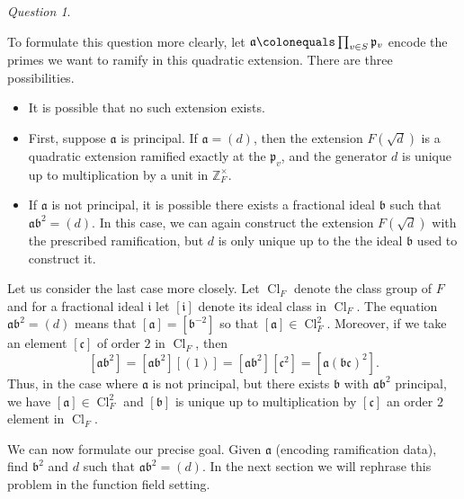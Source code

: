 \documentclass{dcthesis}
\newcommand{\ZZ}{\mathbb Z}
\DeclareMathOperator{\Cl}{Cl}
\numberwithin{equation}{section}
\theoremstyle{definition}
\theoremstyle{remark}
\newtheorem{question}[equation]{Question}
\begin{document}
{{\begin{question}
    \end{question}
    To formulate this question more clearly,
    let
    $
      \mathfrak{a}\colonequals
      \prod_{v\in S}\mathfrak{p}_v
    $
    encode the primes
    we want to ramify in this quadratic extension.
    There are three possibilities.
    \begin{itemize}
      \item
        It is possible that no such
        extension exists.
      \item
        First, suppose
        $\mathfrak{a}$ is principal.
        If $\mathfrak{a} = (d)$,
        then the extension
        $F(\sqrt{d})$ is a quadratic extension
        ramified exactly at the $\mathfrak{p}_v$,
        and the generator $d$ is unique
        up to multiplication
        by a unit in $\ZZ_F^\times$.
      \item
        If $\mathfrak{a}$ is not principal,
        it is possible there
        exists a fractional ideal
        $\mathfrak{b}$ such that
        $\mathfrak{a}\mathfrak{b}^2=(d)$.
        In this case,
        we can again construct the extension
        $F(\sqrt{d})$ with the prescribed
        ramification,
        but $d$ is only unique up to
        the the ideal $\mathfrak{b}$ used
        to construct it.
    \end{itemize}
    Let us consider the last case more closely.
    Let $\Cl_F$ denote the class group of $F$
    and for a fractional ideal
    $\mathfrak{i}$ let $[\mathfrak{i}]$
    denote its ideal class in $\Cl_F$.
    The equation $\mathfrak{a}\mathfrak{b}^2=(d)$
    means that $[\mathfrak{a}] = [\mathfrak{b}^{-2}]$
    so that $[\mathfrak{a}]\in\Cl_F^2$.
    Moreover, if we take an element
    $[\mathfrak{c}]$
    of order $2$
    in $\Cl_F$,
    then
    \begin{equation}
      \label{eqn:twotorsionintheclassgroup}
      [\mathfrak{a}\mathfrak{b}^2]
      =[\mathfrak{a}\mathfrak{b}^2][(1)]
      =[\mathfrak{a}\mathfrak{b}^2][\mathfrak{c}^2]
      =[\mathfrak{a}(\mathfrak{bc})^2].
    \end{equation}
    Thus,
    in the case where $\mathfrak{a}$ is not
    principal,
    but there exists $\mathfrak{b}$ with
    $\mathfrak{a}\mathfrak{b}^2$ principal,
    we have
    $[\mathfrak{a}]\in\Cl_F^2$ and
    $[\mathfrak{b}]$ is unique up to
    multiplication by $[\mathfrak{c}]$
    an order $2$ element in $\Cl_F$.
    \par
    We can now formulate our precise goal.
    Given $\mathfrak{a}$
    (encoding ramification data),
    find $\mathfrak{b}^2$ and $d$ such that
    $\mathfrak{a}\mathfrak{b}^2=(d)$.
    In the next section we will rephrase this
    problem in the function field setting.
  }
}
\end{document}
